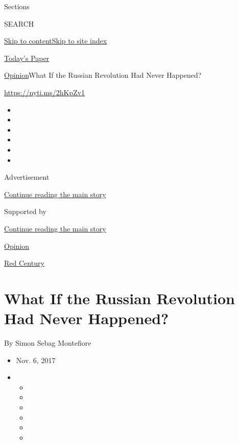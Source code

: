 Sections

SEARCH

\protect\hyperlink{site-content}{Skip to
content}\protect\hyperlink{site-index}{Skip to site index}

\href{https://myaccount.nytimes3xbfgragh.onion/auth/login?response_type=cookie\&client_id=vi}{}

\href{https://www.nytimes3xbfgragh.onion/section/todayspaper}{Today's
Paper}

\href{/section/opinion}{Opinion}\textbar{}What If the Russian Revolution
Had Never Happened?

\url{https://nyti.ms/2hKpZv1}

\begin{itemize}
\item
\item
\item
\item
\item
\item
\end{itemize}

Advertisement

\protect\hyperlink{after-top}{Continue reading the main story}

Supported by

\protect\hyperlink{after-sponsor}{Continue reading the main story}

\href{/section/opinion}{Opinion}

\href{/column/red-century}{Red Century}

\hypertarget{what-if-the-russian-revolution-had-never-happened}{%
\section{What If the Russian Revolution Had Never
Happened?}\label{what-if-the-russian-revolution-had-never-happened}}

By Simon Sebag Montefiore

\begin{itemize}
\item
  Nov. 6, 2017
\item
  \begin{itemize}
  \item
  \item
  \item
  \item
  \item
  \item
  \end{itemize}
\end{itemize}

